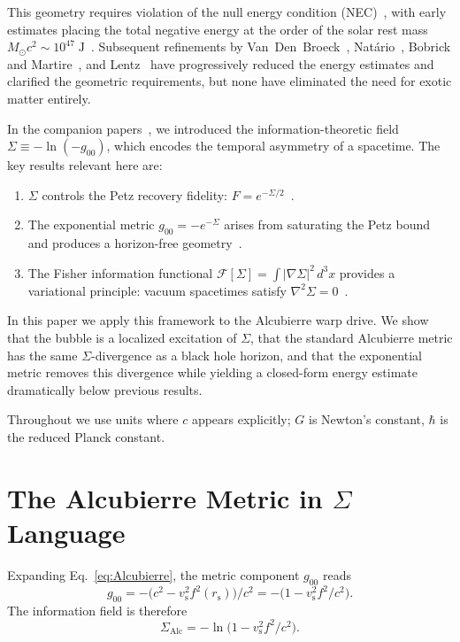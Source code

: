 \documentclass[prd,twocolumn,superscriptaddress,longbibliography]{revtex4-2}
\newcommand{\vs}{v_{\mathrm{s}}}
\newcommand{\rs}{r_{\mathrm{s}}}
\newcommand{\Fisher}{\mathcal{F}}
\begin{document}
This geometry requires violation of the null energy condition
(NEC)~\cite{Alcubierre1994,Pfenning1997}, with early estimates placing the
total negative energy at the order of the solar rest mass
$M_\odot c^2 \sim 10^{47}\;\mathrm{J}$~\cite{Pfenning1997}.  Subsequent
refinements by Van~Den~Broeck~\cite{VanDenBroeck1999},
Nat\'{a}rio~\cite{Natario2002}, Bobrick and
Martire~\cite{BobrickMartire2021}, and Lentz~\cite{Lentz2021} have
progressively reduced the energy estimates and clarified the geometric
requirements, but none have eliminated the need for exotic matter entirely.

In the companion papers~\cite{Huang2026a,Huang2026b}, we introduced
the information-theoretic field
$\Sigma \equiv -\ln(-g_{00})$, which encodes the temporal asymmetry of
a spacetime.  The key results relevant here are:
\begin{enumerate}
\item $\Sigma$ controls the Petz recovery fidelity:
$F = e^{-\Sigma/2}$~\cite{Huang2026a}.
\item The exponential metric $g_{00} = -e^{-\Sigma}$ arises from
saturating the Petz bound and produces a horizon-free
geometry~\cite{Huang2026b}.
\item The Fisher information functional
$\Fisher[\Sigma] = \int |\nabla\Sigma|^2\,d^3x$ provides a variational
principle: vacuum spacetimes satisfy
$\nabla^2\Sigma = 0$~\cite{Huang2026b}.
\end{enumerate}

In this paper we apply this framework to the Alcubierre warp drive.
We show that the bubble is a localized excitation of $\Sigma$, that the
standard Alcubierre metric has the same $\Sigma$-divergence as a black
hole horizon, and that the exponential metric removes this divergence
while yielding a closed-form energy estimate dramatically below previous results.

Throughout we use units where $c$ appears explicitly; $G$ is Newton's
constant, $\hbar$ is the reduced Planck constant.

\section{The Alcubierre Metric in $\Sigma$ Language}
\label{sec:sigma}

Expanding Eq.~\eqref{eq:Alcubierre}, the metric component $g_{00}$ reads
\begin{equation}
\label{eq:g00_Alc}
g_{00} = -\bigl(c^2 - \vs^2 f^2(\rs)\bigr)/c^2
       = -\bigl(1 - \vs^2 f^2/c^2\bigr).
\end{equation}
The information field is therefore
\begin{equation}
\label{eq:Sigma_Alc}
\Sigma_{\mathrm{Alc}} = -\ln\bigl(1 - \vs^2 f^2/c^2\bigr).
\end{equation}
\end{document}

